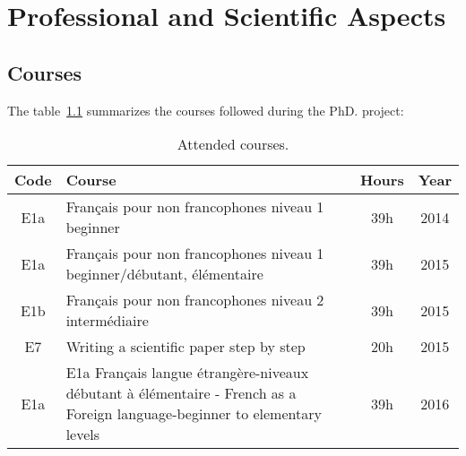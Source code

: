 \chapter{Professional and Scientific Aspects}
\label{chap:professional}
\minitoc

\section{Courses}
The table~\ref{cursos} summarizes the courses followed during the PhD. project:
\begin{table}[h!]
\center
\begin{tabular}{||c|p{8.5cm}|c|c||}
\hline 
\textbf{Code} & \textbf{Course} & \textbf{Hours} & \textbf{Year} \\ 
\hline \hline 
E1a & Fran\c{c}ais pour non francophones niveau 1 beginner & 39h & 2014 \\ 
\hline 
E1a & Fran\c{c}ais pour non francophones niveau 1 beginner/d\'ebutant, \'el\'ementaire & 39h & 2015 \\ 
\hline 
E1b & Fran\c{c}ais pour non francophones niveau 2 interm\'ediaire & 39h & 2015 \\ 
\hline 
E7 & Writing a scientific paper step by step & 20h & 2015 \\ 
\hline 
E1a & E1a Fran\c{c}ais langue \'etrangère-niveaux d\'ebutant \`a \'el\'ementaire - French as a Foreign language-beginner to elementary levels & 39h & 2016 \\ 
\hline 
\end{tabular}\caption{Attended courses.}\label{cursos} 
\end{table}

